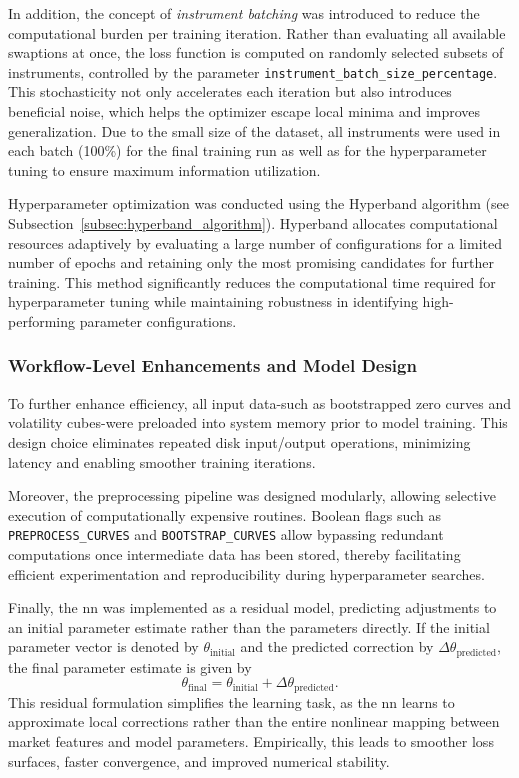 In addition, the concept of \textit{instrument batching} was introduced to reduce the computational burden per training iteration. Rather than evaluating all available swaptions at once, the loss function is computed on randomly selected subsets of instruments, controlled by the parameter \texttt{instrument\_batch\_size\_percentage}. This stochasticity not only accelerates each iteration but also introduces beneficial noise, which helps the optimizer escape local minima and improves generalization. Due to the small size of the dataset, all instruments were used in each batch (100\%) for the final training run as well as for the hyperparameter tuning to ensure maximum information utilization.

Hyperparameter optimization was conducted using the Hyperband algorithm (see Subsection~\ref{subsec:hyperband_algorithm}). Hyperband allocates computational resources adaptively by evaluating a large number of configurations for a limited number of epochs and retaining only the most promising candidates for further training. This method significantly reduces the computational time required for hyperparameter tuning while maintaining robustness in identifying high-performing parameter configurations.

\subsubsection{Workflow-Level Enhancements and Model Design}
To further enhance efficiency, all input data-such as bootstrapped zero curves and volatility cubes-were preloaded into system memory prior to model training. This design choice eliminates repeated disk input/output operations, minimizing latency and enabling smoother training iterations.

Moreover, the preprocessing pipeline was designed modularly, allowing selective execution of computationally expensive routines. Boolean flags such as \texttt{PREPROCESS\_CURVES} and \texttt{BOOTSTRAP\_CURVES} allow bypassing redundant computations once intermediate data has been stored, thereby facilitating efficient experimentation and reproducibility during hyperparameter searches.

Finally, the \ac{nn} was implemented as a residual model, predicting adjustments to an initial parameter estimate rather than the parameters directly. If the initial parameter vector is denoted by $\theta_{\text{initial}}$ and the predicted correction by $\Delta \theta_{\text{predicted}}$, the final parameter estimate is given by
\begin{equation}
	\theta_{\text{final}} = \theta_{\text{initial}} + \Delta \theta_{\text{predicted}}.
\end{equation}
This residual formulation simplifies the learning task, as the \ac{nn} learns to approximate local corrections rather than the entire nonlinear mapping between market features and model parameters. Empirically, this leads to smoother loss surfaces, faster convergence, and improved numerical stability.

